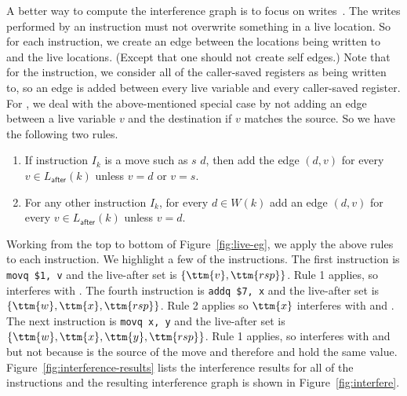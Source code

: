 \documentclass[11pt]{book}
\begin{document}
A better way to compute the interference graph is to focus on
writes~\citep{Appel:2003fk}. The writes performed by an instruction
must not overwrite something in a live location. So for each
instruction, we create an edge between the locations being written to
and the live locations. (Except that one should not create self
edges.)  Note that for the  instruction, we consider all of
the caller-saved registers as being written to, so an edge is added
between every live variable and every caller-saved register. For
, we deal with the above-mentioned special case by not
adding an edge between a live variable $v$ and the destination if $v$
matches the source. So we have the following two rules.

\begin{enumerate}
\item If instruction $I_k$ is a move such as  $s$\key{,}
  $d$, then add the edge $(d,v)$ for every $v \in
  L_{\mathsf{after}}(k)$ unless $v = d$ or $v = s$.

\item For any other instruction $I_k$, for every $d \in W(k)$
  add an edge $(d,v)$ for every $v \in L_{\mathsf{after}}(k)$ unless $v = d$.
  

\end{enumerate}

Working from the top to bottom of Figure~\ref{fig:live-eg}, we apply
the above rules to each instruction. We highlight a few of the
instructions.  The first instruction is \lstinline{movq $1, v} and the
live-after set is $\{\ttm{v},\ttm{rsp}\}$. Rule 1 applies, so 
interferes with .
%
The fourth instruction is \lstinline{addq $7, x} and the live-after
set is $\{\ttm{w},\ttm{x},\ttm{rsp}\}$. Rule 2 applies so $\ttm{x}$
interferes with  and .
%
The next instruction is \lstinline{movq x, y} and the live-after set
is $\{\ttm{w},\ttm{x},\ttm{y},\ttm{rsp}\}$. Rule 1 applies, so 
interferes with  and  but not  because 
is the source of the move and therefore  and  hold the
same value. Figure~\ref{fig:interference-results} lists the
interference results for all of the instructions and the resulting
interference graph is shown in Figure~\ref{fig:interfere}.
\end{document}
